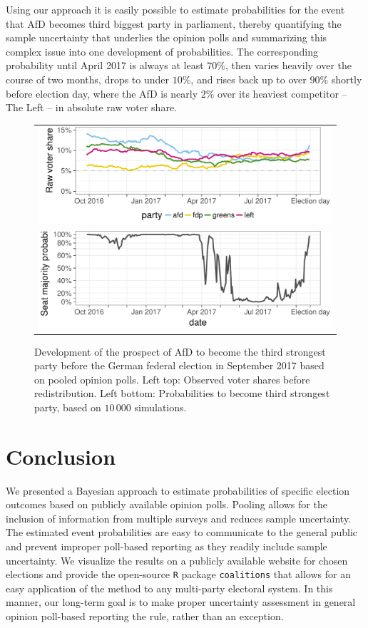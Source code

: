 \documentclass[smallcondensed]{svjour3}     %
\begin{document}
Using our approach it is easily possible to estimate probabilities
for the event that AfD becomes third biggest party in parliament,
thereby quantifying the sample uncertainty that underlies the
opinion polls and summarizing this complex issue into one
development of probabilities.
The corresponding probability until April 2017
is always at least $70\%$, then varies heavily over the course
of two months, drops to under $10\%$, and rises back up to
over $90\%$ shortly before election day, where the AfD is
nearly $2\%$ over its heaviest competitor -- The Left -- in
absolute raw voter share.

\begin{figure}[H]\centering
\begin{tabular}{l}
\includegraphics[height=.15\textwidth]{figures/2017_pooled_afd_rawShares.pdf}
\\
\includegraphics[height=.15\textwidth]{figures/2017_pooled_afd_thirdPartyProb.pdf}
\end{tabular}
\caption{Development of the prospect of AfD to become the third strongest party before the German federal election in September 2017 based on pooled opinion polls.
Left top: Observed voter shares before redistribution. Left bottom: Probabilities to become third strongest party, based on $10\,000$ simulations.
\label{fig:2017_afd}
}
\end{figure}

\section{Conclusion} \label{sec:conclusion}
We presented a Bayesian approach to estimate probabilities of specific election outcomes based on
publicly available opinion polls. Pooling allows for the inclusion of information from multiple
surveys and reduces sample uncertainty.
The estimated event probabilities are easy to communicate to the general public and prevent
improper poll-based reporting as they readily include sample uncertainty.
We visualize the results on a publicly available website for chosen elections and
provide the open-source \texttt{R} package \texttt{coalitions} that allows for an easy
application of the method to any multi-party electoral system.
In this manner, our long-term goal is to make proper uncertainty assessment
in general opinion poll-based reporting the rule, rather than an exception.
\end{document}
